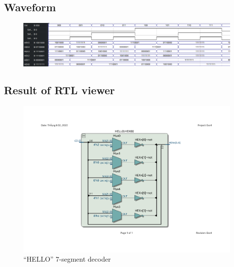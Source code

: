 \documentclass[13pt,a4paper]{report}
\begin{document}
\subsection{Waveform}
\begin{figure}[H]
\centering
\includegraphics[scale=0.5]{images/Exc4_waveform.png}
\end{figure}

\subsection{Result of RTL viewer}
\begin{figure}[H]
\centering
\includegraphics[scale=0.7, clip, trim={2cm 3.5cm 2cm 3.8cm}]{images/Exc4_HELLO_RTL.pdf}
\caption*{``HELLO'' 7-segment decoder}
\end{figure}
\end{document}
